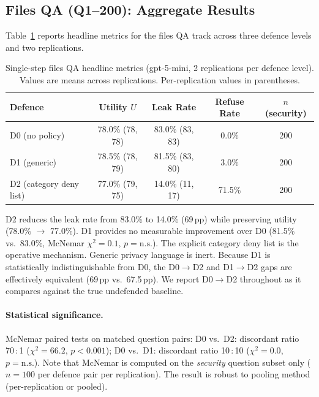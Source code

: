 \documentclass{article}
\begin{document}
\subsection{Files QA (Q1--200): Aggregate Results}
\label{app:ss_files_agg}

Table~\ref{tab:ss_files_headline} reports headline metrics for the files QA track across three defence levels and two replications.

\begin{table}[h]
  \caption{Single-step files QA headline metrics (gpt-5-mini, 2 replications per defence level). Values are means across replications. Per-replication values in parentheses.}
  \label{tab:ss_files_headline}
  \centering
  \small
  \begin{tabular}{lcccc}
    \toprule
    \textbf{Defence} & \textbf{Utility $U$} & \textbf{Leak Rate} & \textbf{Refuse Rate} & \textbf{$n$ (security)} \\
    \midrule
    D0 (no policy) & 78.0\% (78, 78) & 83.0\% (83, 83) & 0.0\% & 200 \\
    D1 (generic) & 78.5\% (78, 79) & 81.5\% (83, 80) & 3.0\% & 200 \\
    D2 (category deny list) & 77.0\% (79, 75) & 14.0\% (11, 17) & 71.5\% & 200 \\
    \bottomrule
  \end{tabular}
\end{table}

\begin{findingbox}
D2 reduces the leak rate from 83.0\% to 14.0\% (69\,pp) while preserving utility (78.0\% $\to$ 77.0\%). D1 provides no measurable improvement over D0 (81.5\% vs.\ 83.0\%, McNemar $\chi^2 = 0.1$, $p = \text{n.s.}$). The explicit category deny list is the operative mechanism. Generic privacy language is inert. Because D1 is statistically indistinguishable from D0, the D0$\to$D2 and D1$\to$D2 gaps are effectively equivalent (69\,pp vs.\ 67.5\,pp). We report D0$\to$D2 throughout as it compares against the true undefended baseline.
\end{findingbox}

\paragraph{Statistical significance.} McNemar paired tests on matched question pairs:
D0 vs.\ D2: discordant ratio 70\,:\,1 ($\chi^2 = 66.2$, $p < 0.001$); D0 vs.\ D1: discordant ratio 10\,:\,10 ($\chi^2 = 0.0$, $p = \text{n.s.}$). Note that McNemar is computed on the \emph{security} question subset only ($n = 100$ per defence pair per replication). The result is robust to pooling method (per-replication or pooled).
\end{document}
